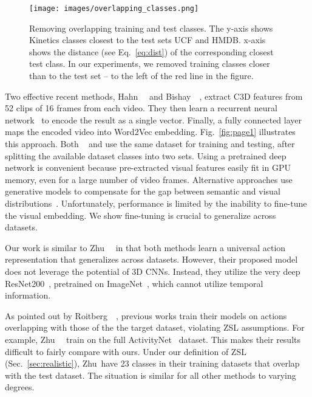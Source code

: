 \documentclass[10pt,twocolumn,letterpaper]{article}
\begin{document}
\begin{figure}
\centering
\texttt{[image: images/overlapping\_classes.png]}
\caption{Removing overlapping training and test classes. The y-axis shows Kinetics classes closest to the test sets UCF and HMDB. x-axis shows the distance (see Eq.~\ref{eq:dist}) of the corresponding closest test class. In our experiments, we removed training classes closer than  to the test set -- to the left of the red line in the figure.}
\label{fig:overlapping}
\end{figure}

Two effective recent methods, Hahn~\etal~\cite{action2vec} and Bishay~\etal~\cite{tarn}, extract C3D features from 52 clips of 16 frames from each video. They then learn a recurrent neural network~\cite{gru, lstm} to encode the result as a single vector. Finally, a fully connected layer maps the encoded video into Word2Vec embedding. Fig.~\ref{fig:page1} illustrates this approach. Both ~\cite{action2vec} and \cite{tarn} use the same dataset for training and testing, after splitting the available dataset classes into two sets. Using a pretrained deep network is convenient because pre-extracted visual features easily fit in GPU memory, even for a large number of video frames. Alternative approaches use generative models to compensate for the gap between semantic and visual distributions~\cite{mishra2018generative, zhang2018visual}. Unfortunately, performance is limited by the inability to fine-tune the visual embedding. We show fine-tuning is crucial to generalize across datasets. 

Our work is similar to Zhu~\etal~\cite{uar} in that both methods learn a universal action representation that generalizes across datasets. However, their proposed model does not leverage the potential of 3D CNNs. Instead, they utilize the very deep ResNet200~\cite{resnet}, pretrained on ImageNet~\cite{imagenet1,imagenet2}, which cannot utilize temporal information. 

As pointed out by Roitberg~\etal~\cite{roitberg2018towards}, previous works train their models on actions overlapping with those of the the target dataset, violating ZSL assumptions. For example, Zhu~\etal~\cite{uar} train on the full ActivityNet~\cite{activitynet} dataset. This makes their results difficult to fairly compare with ours. Under our definition of ZSL (Sec.~\ref{sec:realistic}), Zhu~\etal have 23 classes in their training datasets that overlap with the test dataset. The situation is similar for all other methods to varying degrees.
\end{document}

